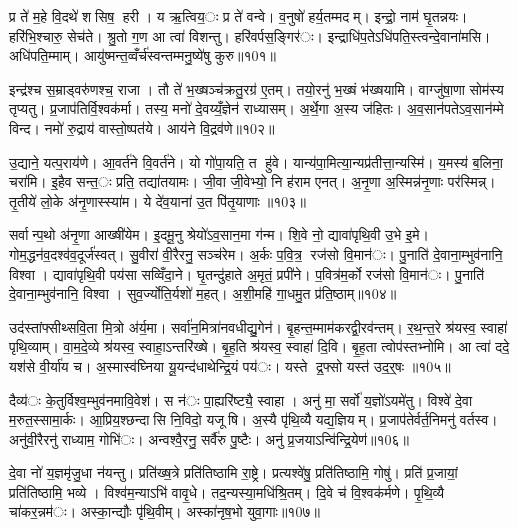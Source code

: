 प्र ते॑ म॒हे वि॒दथे॑ शसिष॒ हरी। य ऋ॒त्विय॒ः प्र ते॑ वन्वे। व॒नुषो॑ हर्य॒तम्मदम्। इन्द्रो॒ नाम॑ घृ॒तन्नयः। हरि॑भि॒श्चारु॒ सेच॑ते। श्रु॒तो ग॒ण आ त्वा॑ विशन्तु। हरि॑वर्पस॒ङ्गिर॑ः। इन्द्राधि॑प॒तेऽधि॑पति॒स्त्वन्दे॒वाना॑मसि। अधि॑पति॒म्माम्। आयु॑ष्मन्त॒व्वँर्च॑स्वन्तम्मनु॒ष्ये॑षु कुरु॥१0१॥

इन्द्र॑श्च स॒म्राड्वरु॑णश्च॒ राजा। तौ ते॑ भ॒ख्षञ्च॑क्रतु॒रग्र॑ ए॒तम्। तयो॒रनु॑ भ॒ख्षं भ॑ख्षयामि। वाग्जु॑षा॒णा सोम॑स्य तृप्यतु। प्र॒जाप॑तिर्वि॒श्वक॑र्मा। तस्य॒ मनो॑ दे॒वय्यँ॒ज्ञेन॑ राध्यासम्। अ॒र्थे॒गा अ॒स्य ज॑हितः। अ॒व॒सान॑पतेऽव॒सान॑म्मे विन्द। नमो॑ रु॒द्राय॑ वास्तो॒ष्पत॑ये। आय॑ने वि॒द्रव॑णे॥१0२॥

उ॒द्याने॒ यत्प॒राय॑णे। आ॒वर्त॑ने वि॒वर्त॑ने। यो गो॑पा॒यति॒ त हु॑वे। यान्य॑पा॒मित्या॒न्यप्र॑तीत्ता॒न्यस्मि॑। य॒मस्य॑ ब॒लिना॒ चरा॑मि। इ॒हैव सन्त॒ः प्रति॒ तद्या॑तयामः। जी॒वा जी॒वेभ्यो॒ नि ह॑राम एनत्। अ॒नृ॒णा अ॒स्मिन्न॑नृ॒णाः पर॑स्मिन्न्। तृ॒तीये॑ लो॒के अ॑नृ॒णास्स्या॑म। ये दे॑व॒याना॑ उ॒त पि॑तृ॒याणाः॥१0३॥

सर्वान्प॒थो अ॑नृ॒णा आख्षी॑येम। इ॒दमू॒नु श्रेयो॑ऽव॒सान॒मा ग॑न्म। शि॒वे नो॒ द्यावा॑पृथि॒वी उ॒भे इ॒मे। गोम॒द्धन॑व॒दश्व॑व॒दूर्ज॑स्वत्। सु॒वीरा॑ वी॒रैरनु॒ सञ्च॑रेम। अ॒र्कः प॒वि॒त्र॒ रज॑सो वि॒मान॑ः। पु॒नाति॑ दे॒वाना॒म्भुव॑नानि॒ विश्वा। द्यावा॑पृथि॒वी पय॑सा सव्विँदा॒ने। घृ॒तन्दु॑हाते अ॒मृतं॒ प्रपी॑ने। प॒वित्र॑म॒र्को रज॑सो वि॒मान॑ः। पु॒नाति॑ दे॒वाना॒म्भुव॑नानि॒ विश्वा। सुव॒र्ज्योति॒र्यशो॑ म॒हत्। अ॒शी॒महि॑ गा॒धमु॒त प्र॑ति॒ष्ठाम्॥१0४॥


उद॑स्तांफ्सीथ्सवि॒ता मि॒त्रो अ॑र्य॒मा। सर्वा॑न॒मित्रा॑नवधीद्यु॒गेन॑। बृ॒हन्त॒म्माम॑करद्वी॒रव॑न्तम्। र॒थ॒न्त॒रे श्र॑यस्व॒ स्वाहा॑ पृथि॒व्याम्। वा॒म॒दे॒व्ये श्र॑यस्व॒ स्वाहा॒ऽन्तरि॑ख्षे। बृ॒ह॒ति श्र॑यस्व॒ स्वाहा॑ दि॒वि। बृ॒ह॒ता त्वोप॑स्तभ्नोमि। आ त्वा॑ ददे॒ यश॑से वी॒र्या॑य च। अ॒स्मास्व॑घ्निया यू॒यन्द॑धाथेन्द्रि॒यं पय॑ः। यस्ते द्र॒फ्सो यस्त॑ उद॒र्॒षः ॥१0५॥

दैव्य॑ः के॒तुर्विश्व॒म्भुव॑नमावि॒वेश॑। स न॑ः पा॒ह्यरि॑ष्ट्यै॒ स्वाहा। अनु॑ मा॒ सर्वो॑ य॒ज्ञो॑ऽयमे॑तु। विश्वे॑ दे॒वा म॒रुत॒स्सामा॒र्कः। आ॒प्रिय॒श्छन्दासि नि॒विदो॒ यजूषि। अ॒स्यै पृ॑थि॒व्यै यद्य॒ज्ञियम्। प्र॒जाप॑तेर्वर्त॒निमनु॑ वर्तस्व। अनु॑वी॒रैरनु॑ राध्याम॒ गोभि॑ः। अन्वश्वै॒रनु॒ सर्वै॑रु पु॒ष्टैः। अनु॑ प्र॒जयाऽन्वि॑न्द्रि॒येण॑॥१0६॥

दे॒वा नो॑ य॒ज्ञमृ॑जु॒धा न॑यन्तु। प्रति॑ख्ष॒त्रे प्रति॑तिष्ठामि रा॒ष्ट्रे। प्रत्यश्वे॑षु॒ प्रति॑तिष्ठामि॒ गोषु॑। प्रति॑ प्र॒जायां॒ प्रति॑तिष्ठामि॒ भव्ये। विश्व॑म॒न्याऽभि॑ वावृ॒धे। तद॒न्यस्या॒मधि॑श्रि॒तम्। दि॒वे च॑ वि॒श्वक॑र्मणे। पृ॒थि॒व्यै चा॑कर॒न्नम॑ः। अस्का॒न्द्यौः पृ॑थि॒वीम्। अस्का॑नृष॒भो युवा॒गाः॥१0७॥

